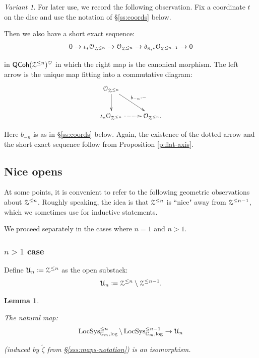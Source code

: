 \documentclass[reqno,11pt]{amsart}
\numberwithin{equation}{subsection}
\newtheorem{lem}[thm]{Lemma}
\theoremstyle{remark}
\newtheorem{variant}[thm]{Variant}
\newcommand{\bG}{{\mathbb G}}
\newcommand{\sO}{{\EuScript O}}
\newcommand{\sU}{{\EuScript U}}
\newcommand{\sZ}{{\EuScript Z}}
\newcommand{\on}{\operatorname}
\newcommand{\LocSys}{\on{LocSys}}
\newcommand{\heart}{\heartsuit}
\newcommand{\QCoh}{\mathsf{QCoh}}
\begin{document}
\begin{variant}

For later use, we record the following observation. Fix 
a coordinate $t$ on the disc and use the notation of \S \ref{ss:coords} below. 

Then we also have a short exact sequence:
%
\begin{equation}\label{eq:fund-ses-2}
0 \to \iota_*\sO_{\sZ^{\leq n}} \to \sO_{\sZ^{\leq n}} \to 
\delta_{n,*}\sO_{\sZ^{\leq n-1}} \to 0 
\end{equation}

\noindent in $\QCoh(\sZ^{\leq n})^{\heart}$ in which the right
map is the canonical morphism. The left arrow is the unique map fitting
into a commutative diagram:
%
\[
\xymatrix{
\sO_{\sZ^{\leq n}} \ar[d] \ar[dr]^{b_{-n} \cdot -} \\
\iota_*\sO_{\sZ^{\leq n}} \ar@{..>}[r] & \sO_{\sZ^{\leq n}}.
}
\]

\noindent Here $b_{-n}$ is as in \S \ref{ss:coords} below. 
Again, the existence of the dotted arrow and the short exact sequence
follow from Proposition \ref{p:flat-axis}.

\end{variant}

\subsection{Nice opens}\label{ss:un}

At some points, it is convenient to refer to the following geometric observations
about $\sZ^{\leq n}$. Roughly speaking, the idea is that 
$\sZ^{\leq n}$ is ``nice" away from $\sZ^{\leq n-1}$, which we sometimes use
for inductive statements. 

We proceed separately in the cases where $n = 1$ and $n > 1$. 


\subsubsection{$n>1$ case}

Define $\sU_n \coloneqq \sZ^{\leq n}$ as the open substack:
%
\[
\sU_n \coloneqq \sZ^{\leq n} \setminus \sZ^{\leq n-1}.
\]

\begin{lem}\label{l:un}

The natural map:
%
\[
\LocSys_{\bG_m,\log}^{\leq n} \setminus \LocSys_{\bG_m,\log}^{\leq n-1}
\to 
\sU_n
\]

\noindent (induced by $\widetilde{\zeta}$ from \S \ref{sss:maps-notation})
is an isomorphism. 

\end{lem}
\end{document}
